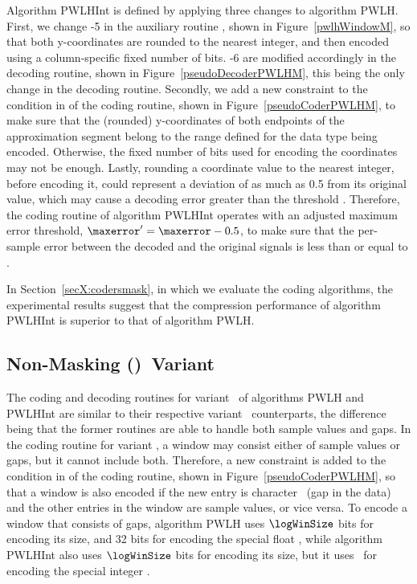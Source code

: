Algorithm PWLHInt is defined by applying three changes to algorithm PWLH. First, we change -5 in the auxiliary routine \EncodeWindow, shown in Figure~\ref{pwlhWindowM}, so that both y-coordinates are rounded to the nearest integer, and then encoded using a column-specific fixed number of bits. -6 are modified accordingly in the decoding routine, shown in Figure~\ref{pseudoDecoderPWLHM}, this being the only change in the decoding routine. Secondly, we add a new constraint to the condition in  of the coding routine, shown in Figure~\ref{pseudoCoderPWLHM}, to make sure that the (rounded) y-coordinates of both endpoints of the approximation segment belong to the range defined for the data type being encoded. Otherwise, the fixed number of bits used for encoding the coordinates may not be enough. Lastly, rounding a coordinate value to the nearest integer, before encoding it, could represent a deviation of as much as 0.5 from its original value, which may cause a decoding error greater than the threshold \maxerror. Therefore, the coding routine of algorithm PWLHInt operates with an adjusted maximum error threshold, $\maxerror' = \maxerror - 0.5$, to make sure that the per-sample error between the decoded and the original signals is less than or equal to \maxerror.


In Section~\ref{secX:codersmask}, in which we evaluate the coding algorithms, the experimental results suggest that the compression performance of algorithm PWLHInt is superior to that of algorithm PWLH.




\subsection{Non-Masking (\NOmaskalgo)\ Variant}
\label{algo:pwhl:nmvariant}


The coding and decoding routines for variant \NOmaskalgo\ of algorithms PWLH and PWLHInt are similar to their respective variant \maskalgo\ counterparts, the difference being that the former routines are able to handle both sample values and gaps. In the coding routine for variant \NOmaskalgo, a window may consist either of sample values or gaps, but it cannot include both. Therefore, a new constraint is added to the condition in  of the coding routine, shown in Figure~\ref{pseudoCoderPWLHM}, so that a window is also encoded if the new entry is character \noData\ (gap in the data) and the other entries in the window are sample values, or vice versa. To encode a window that consists of gaps, algorithm PWLH uses $\logWinSize$ bits for encoding its size, and 32 bits for encoding the special float \nodatafloat, while algorithm PWLHInt also uses $\logWinSize$ bits for encoding its size, but it uses \tobitexp\ for encoding the special integer \nodata.

